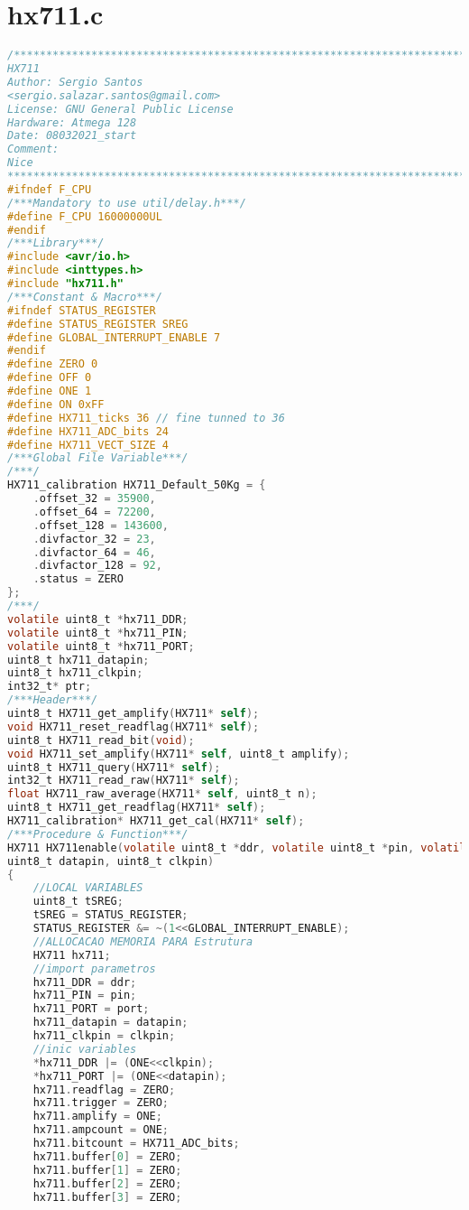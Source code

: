 \chapter{hx711.c}
\begin{lstlisting}[language=C, caption={hx711.c}, label=hx711-c, captionpos=b]
/*************************************************************************
HX711
Author: Sergio Santos
<sergio.salazar.santos@gmail.com>
License: GNU General Public License     
Hardware: Atmega 128
Date: 08032021_start
Comment:
Nice
************************************************************************/
#ifndef F_CPU
/***Mandatory to use util/delay.h***/
#define F_CPU 16000000UL
#endif
/***Library***/
#include <avr/io.h>
#include <inttypes.h>
#include "hx711.h"
/***Constant & Macro***/
#ifndef STATUS_REGISTER
#define STATUS_REGISTER SREG
#define GLOBAL_INTERRUPT_ENABLE 7
#endif
#define ZERO 0
#define OFF 0
#define ONE 1
#define ON 0xFF
#define HX711_ticks 36 // fine tunned to 36
#define HX711_ADC_bits 24
#define HX711_VECT_SIZE 4
/***Global File Variable***/
/***/
HX711_calibration HX711_Default_50Kg = {
	.offset_32 = 35900,
	.offset_64 = 72200,
	.offset_128 = 143600,
	.divfactor_32 = 23,
	.divfactor_64 = 46,
	.divfactor_128 = 92,
	.status = ZERO
};
/***/
volatile uint8_t *hx711_DDR;
volatile uint8_t *hx711_PIN;
volatile uint8_t *hx711_PORT;
uint8_t hx711_datapin;
uint8_t hx711_clkpin;
int32_t* ptr;
/***Header***/
uint8_t HX711_get_amplify(HX711* self);
void HX711_reset_readflag(HX711* self);
uint8_t HX711_read_bit(void);
void HX711_set_amplify(HX711* self, uint8_t amplify);
uint8_t HX711_query(HX711* self);
int32_t HX711_read_raw(HX711* self);
float HX711_raw_average(HX711* self, uint8_t n);
uint8_t HX711_get_readflag(HX711* self);
HX711_calibration* HX711_get_cal(HX711* self);
/***Procedure & Function***/
HX711 HX711enable(volatile uint8_t *ddr, volatile uint8_t *pin, volatile uint8_t *port, 
uint8_t datapin, uint8_t clkpin)
{
	//LOCAL VARIABLES
	uint8_t tSREG;
	tSREG = STATUS_REGISTER;
	STATUS_REGISTER &= ~(1<<GLOBAL_INTERRUPT_ENABLE);
	//ALLOCACAO MEMORIA PARA Estrutura
	HX711 hx711;
	//import parametros
	hx711_DDR = ddr;
	hx711_PIN = pin;
	hx711_PORT = port;
	hx711_datapin = datapin;
	hx711_clkpin = clkpin;
	//inic variables
	*hx711_DDR |= (ONE<<clkpin);
	*hx711_PORT |= (ONE<<datapin);
	hx711.readflag = ZERO;
	hx711.trigger = ZERO;
	hx711.amplify = ONE;
	hx711.ampcount = ONE;
	hx711.bitcount = HX711_ADC_bits;
	hx711.buffer[0] = ZERO;
	hx711.buffer[1] = ZERO;
	hx711.buffer[2] = ZERO;
	hx711.buffer[3] = ZERO;

\end{lstlisting}
